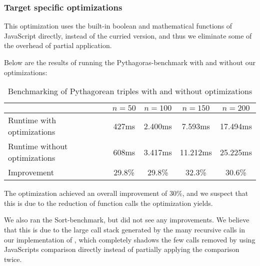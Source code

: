 \subsubsection{Target specific optimizations}
This optimization uses the built-in boolean and mathematical functions of JavaScript directly, instead of the curried version, and thus we eliminate some of the overhead of partial application.

Below are the results of running the Pythagoras-benchmark with and without our optimizations:
\begin{table}[h]
  \centering
  \begin{tabular}{|l|c|c|c|c|}
    \hline
                   & $n = 50$ & $n = 100$ & $n = 150$ & $n = 200$ \\
    \hline
    Runtime with optimizations & 427ms & 2.400ms  & 7.593ms & 17.494ms            \\
    Runtime without optimizations & 608ms & 3.417ms & 11.212ms  & 25.225ms             \\
    Improvement & 29.8\% & 29.8\% & 32.3\%  & 30.6\%             \\
    \hline
  \end{tabular}
  \caption{Benchmarking of Pythagorean triples with and without optimizations}
\end{table}

The optimization achieved an overall improvement of 30\%, and we suspect that this is due to the reduction of function calls the optimization yields.

We also ran the Sort-benchmark, but did not see any improvements. We believe that this is due to the large call stack generated by the many recursive calls in our implementation of , which completely shadows the few calls removed by using JavaScripts comparison directly instead of partially applying the comparison twice.
